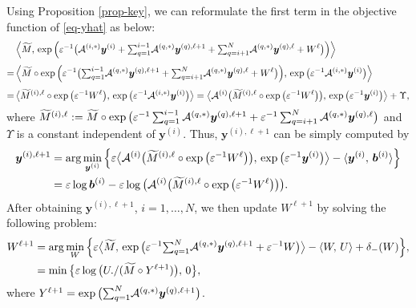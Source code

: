 \documentclass[10pt]{article}
\newcommand{\cA}{{\cal A}}
\newcommand{\inprod}[2]{\langle #1 , #2 \rangle }
\def\inprod#1#2{\langle#1,\,#2\rangle}
\def\Inprod#1#2{\Big\langle#1,\,#2\Big\rangle}
\begin{document}
Using Proposition \ref{prop-key}, we can reformulate the first term in the objective function of \eqref{eq-yhat} as below:
\begin{equation*}
\begin{aligned}
&\Inprod{\widetilde{M}}{ \exp \Big( \varepsilon^{-1}  \big( \cA^{(i,*)} \bm{y}^{(i)} + \mbox{$\sum_{q=1}^{i-1} $} \cA^{(q,*)} \bm{y}^{(q),\ell+1} + \mbox{$\sum_{q=i+1}^{N} $} \cA^{(q,*)} \bm{y}^{(q),\ell}+ W^\ell \big)\Big)}
\\[3pt]
=\, & \Inprod{\widetilde{M}\circ \exp \Big( \varepsilon^{-1} \big( \mbox{$\sum_{q=1}^{i-1} $} \cA^{(q,*)} \bm{y}^{(q),\ell+1} +
\mbox{$\sum_{q=i+1}^{N} $} \cA^{(q,*)} \bm{y}^{(q),\ell}+ W^\ell \big)\Big)}{ \exp \big( \varepsilon^{-1}  \cA^{(i,*)} \bm{y}^{(i)} \big)}
\\[3pt]
=\, & \big\langle \widetilde{M}^{(i),\ell}\circ \exp\big(\varepsilon^{-1} W^\ell \big), \,\exp \big( \varepsilon^{-1}  \cA^{(i,*)} \bm{y}^{(i)}\big)\big\rangle
=
\big\langle\cA^{(i)}\big( \widetilde{M}^{(i),\ell} \circ \exp\big (\varepsilon^{-1}W^\ell \big)\big), \,\exp\big(  \varepsilon^{-1}\bm{y}^{(i)} \big)\big\rangle + \Upsilon,
\end{aligned}
\end{equation*}
where $\widetilde{M}^{(i),\ell} := \widetilde{M}\circ\exp\big( \varepsilon^{-1}\sum_{q=1}^{i-1}\cA^{(q,*)}\bm{y}^{(q),\ell+1} + \varepsilon^{-1}\sum_{q=i+1}^{N}\cA^{(q,*)}\bm{y}^{(q),\ell}\big)$ and $\Upsilon$ is a constant independent of $\bm{y}^{(i)}$. Thus, $\bm{y}^{(i),\ell+1}$ can be simply computed by
\begin{equation*}
\begin{aligned}
\bm{y}^{(i),\ell+1}
&= \arg\min_{\bm{y}^{(i)}} \Big\{\varepsilon \big\langle\cA^{(i)}\big( \widetilde{M}^{(i),\ell} \circ \exp\big (\varepsilon^{-1}W^\ell \big) \big), \,\exp\big( \varepsilon^{-1}\bm{y}^{(i)} \big)\big\rangle
- \inprod{\bm{y}^{(i)}}{\bm{b}^{(i)}} \Big\}   \\
&= \varepsilon \log \bm{b}^{(i)} - \varepsilon\log \big( \cA^{(i)}\big( \widetilde{M}^{(i),\ell} \circ \exp\big (\varepsilon^{-1}W^\ell \big)\big)\big).
\end{aligned}
\end{equation*}
After obtaining $\bm{y}^{(i),\ell+1}$, $i = 1,\dots,N$, we then update $W^{\ell+1}$ by solving the following problem:
\begin{equation*}
\begin{aligned}
W^{\ell+1}
&=\arg\min_W\Big\{\varepsilon \big\langle\widetilde{M}, \,\exp\big( \varepsilon^{-1}\mbox{$\sum_{q=1}^{N} $}\cA^{(q,*)}\bm{y}^{(q),\ell+1} + \varepsilon^{-1}W \big)\big\rangle - \inprod{W}{U} + \delta_{-}(W) \Big\}, \\
&=\min\big\{ \varepsilon\log\big( U./(\widetilde{M}\circ Y^{\ell+1}) \big), \,0  \big\},
\end{aligned}
\end{equation*}
where $Y^{\ell+1} = \exp\big( \mbox{$\sum_{q=1}^{N}
$}\cA^{(q,*)}\bm{y}^{(q),\ell+1} \big)$.
\end{document}
